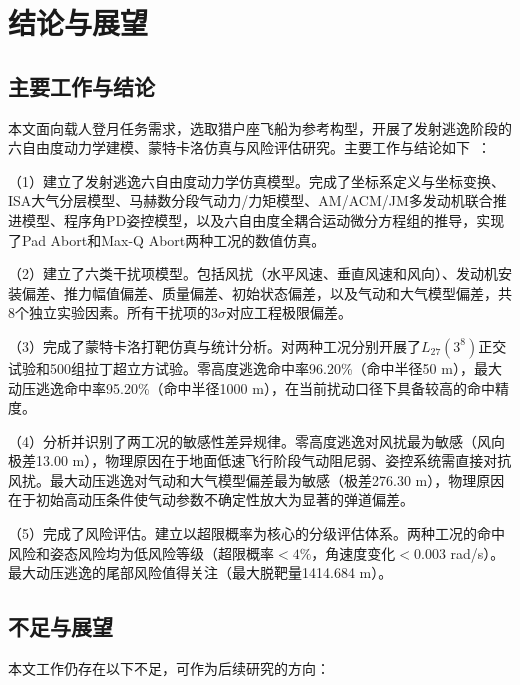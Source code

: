 
\chapter{结论与展望}

\section{主要工作与结论}

本文面向载人登月任务需求，选取猎户座飞船为参考构型，开展了发射逃逸阶段的六自由度动力学建模、蒙特卡洛仿真与风险评估研究。主要工作与结论如下~\cite{刁伟鹤2025,Antonsen2023}：

（1）建立了发射逃逸六自由度动力学仿真模型。完成了坐标系定义与坐标变换、ISA大气分层模型、马赫数分段气动力/力矩模型、AM/ACM/JM多发动机联合推进模型、程序角PD姿控模型，以及六自由度全耦合运动微分方程组的推导，实现了Pad Abort和Max-Q Abort两种工况的数值仿真。

（2）建立了六类干扰项模型。包括风扰（水平风速、垂直风速和风向）、发动机安装偏差、推力幅值偏差、质量偏差、初始状态偏差，以及气动和大气模型偏差，共8个独立实验因素。所有干扰项的$3\sigma$对应工程极限偏差。

（3）完成了蒙特卡洛打靶仿真与统计分析。对两种工况分别开展了$L_{27}(3^8)$正交试验和500组拉丁超立方试验。零高度逃逸命中率96.20\%（命中半径50 m），最大动压逃逸命中率95.20\%（命中半径1000 m），在当前扰动口径下具备较高的命中精度。

（4）分析并识别了两工况的敏感性差异规律。零高度逃逸对风扰最为敏感（风向极差13.00 m），物理原因在于地面低速飞行阶段气动阻尼弱、姿控系统需直接对抗风扰。最大动压逃逸对气动和大气模型偏差最为敏感（极差276.30 m），物理原因在于初始高动压条件使气动参数不确定性放大为显著的弹道偏差。

（5）完成了风险评估。建立以超限概率为核心的分级评估体系。两种工况的命中风险和姿态风险均为低风险等级（超限概率$<4\%$，角速度变化$<0.003$ rad/s）。最大动压逃逸的尾部风险值得关注（最大脱靶量1414.684 m）。

\section{不足与展望}

本文工作仍存在以下不足，可作为后续研究的方向：

